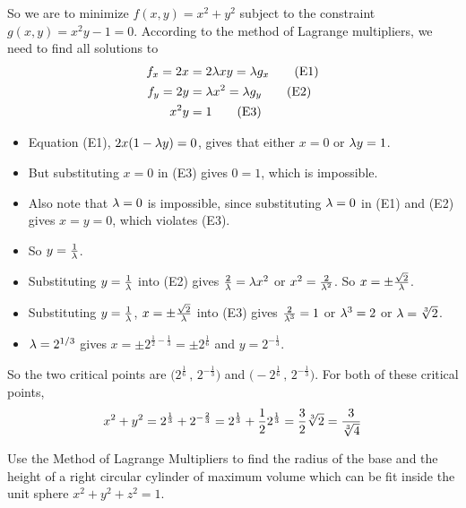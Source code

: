 \begin{solution}
So we are to minimize  $f(x,y) = x^2+y^2 $
subject to the constraint $g(x,y) = x^2 y -1=0$.
According to the method of Lagrange multipliers, we need to find 
all solutions to
\begin{align*}
f_x = 2x &=2 \lambda xy = \lambda g_x \tag{E1} \\ 
f_y = 2y &= \lambda x^2 = \lambda g_y \tag{E2} \\ 
x^2y&=1 \tag{E3}
\end{align*}
\begin{itemize}
\item
Equation (E1), $2x(1-\lambda y)=0$, gives that either $x=0$ or $\lambda y=1$. 
\item
But substituting $x=0$ in (E3) gives $0=1$, which is impossible.
\item
Also note that $\lambda=0$ is impossible, since substituting $\lambda=0$ in (E1)
and (E2) gives $x=y=0$, which violates (E3).
\item
So $y=\frac{1}{\lambda}$. 
\item
Substituting $y=\frac{1}{\lambda}$ into (E2) gives $\frac{2}{\lambda} = \lambda x^2$
or $x^2=\frac{2}{\lambda^2}$. So $x=\pm\frac{\sqrt{2}}{\lambda}$.
\item
Substituting $y=\frac{1}{\lambda}$, $x=\pm\frac{\sqrt{2}}{\lambda}$ into (E3) gives
$\frac{2}{\lambda^3} =1$ or $\lambda^3 =  2$ or
$\la= \root{3}\of{2}$.
\item
$\lambda= 2^{1/3}$ gives $x=\pm 2^{\frac{1}{2}-\frac{1}{3}}=\pm 2^{\frac{1}{6}}$
   and $y= 2^{-\frac{1}{3}}$.
\end{itemize}
So the two critical points are $\big(2^{\frac{1}{6}}\,,\,2^{-\frac{1}{3}}\big)$
and $\big(-2^{\frac{1}{6}}\,,\,2^{-\frac{1}{3}}\big)$. For both of these
critical points, 
\begin{equation*}
x^2+y^2= 2^{\frac{1}{3}} + 2^{-\frac{2}{3}}
       = 2^{\frac{1}{3}} + \frac{1}{2}2^{\frac{1}{3}} 
       =\frac{3}{2}\root{3}\of{2}
       =\frac{3}{\sqrt[3]{4}}
\end{equation*}
\end{solution}

\begin{question}[M200 2006A] %
Use the Method of Lagrange Multipliers to find the radius of the base 
and the height of a right circular cylinder of maximum volume which can 
be fit inside the unit sphere $x^2 + y^2 + z^2 = 1$.
\end{question}

%

